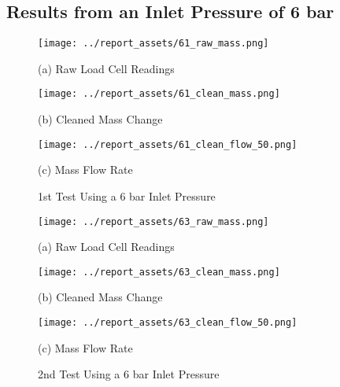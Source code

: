 \subsection{Results from an Inlet Pressure of 6 bar}
\vfill
\begin{figure}[htbp]
    \centering

    \begin{minipage}{0.32\textwidth}
        \centering
        \texttt{[image: ../report\_assets/61\_raw\_mass.png]}
        \caption*{(a) Raw Load Cell Readings}
    \end{minipage}
    \hfill
    \begin{minipage}{0.32\textwidth}
        \centering
        \texttt{[image: ../report\_assets/61\_clean\_mass.png]}
        \caption*{(b) Cleaned Mass Change}
    \end{minipage}
    \hfill
    \begin{minipage}{0.32\textwidth}
        \centering
        \texttt{[image: ../report\_assets/61\_clean\_flow\_50.png]}
        \caption*{(c) Mass Flow Rate}
    \end{minipage}
    \caption{1st Test Using a 6 bar Inlet Pressure}
    
\end{figure}\label{fig:61}

\vfill
\begin{figure}[htbp]
    \centering

    \begin{minipage}{0.32\textwidth}
        \centering
        \texttt{[image: ../report\_assets/63\_raw\_mass.png]}
        \caption*{(a) Raw Load Cell Readings}
    \end{minipage}
    \hfill
    \begin{minipage}{0.32\textwidth}
        \centering
        \texttt{[image: ../report\_assets/63\_clean\_mass.png]}
        \caption*{(b) Cleaned Mass Change}
    \end{minipage}
    \hfill
    \begin{minipage}{0.32\textwidth}
        \centering
        \texttt{[image: ../report\_assets/63\_clean\_flow\_50.png]}
        \caption*{(c) Mass Flow Rate}
    \end{minipage}
    \caption{2nd Test Using a 6 bar Inlet Pressure}
    
\end{figure}\label{fig:63}

